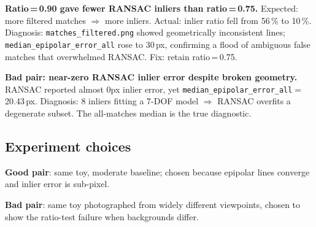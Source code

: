 \documentclass[10pt,a4paper]{article}
\begin{document}
\textbf{Ratio\,=\,0.90 gave fewer RANSAC inliers than ratio\,=\,0.75.}
Expected: more filtered matches $\Rightarrow$ more inliers.
Actual: inlier ratio fell from 56\,\% to 10\,\%.
Diagnosis: \texttt{matches\_filtered.png} showed geometrically inconsistent
lines; \texttt{median\_epipolar\_error\_all} rose to 30\,px, confirming a
flood of ambiguous false matches that overwhelmed RANSAC.
Fix: retain ratio\,=\,0.75.

\textbf{ Bad pair: near-zero RANSAC inlier error despite broken geometry.}
RANSAC reported almost 0px inlier error, yet
\texttt{median\_epipolar\_error\_all}$=$20.43\,px.
Diagnosis: 8 inliers fitting a 7-DOF model $\Rightarrow$ RANSAC overfits a
degenerate subset. The all-matches median is the true diagnostic.

\subsection*{Experiment choices}

\textbf{Good pair}: same toy, moderate
baseline; chosen because epipolar lines converge and inlier error is sub-pixel.

\textbf{Bad pair}: same toy photographed from widely different viewpoints, chosen to show the ratio-test failure when backgrounds differ.
\end{document}
